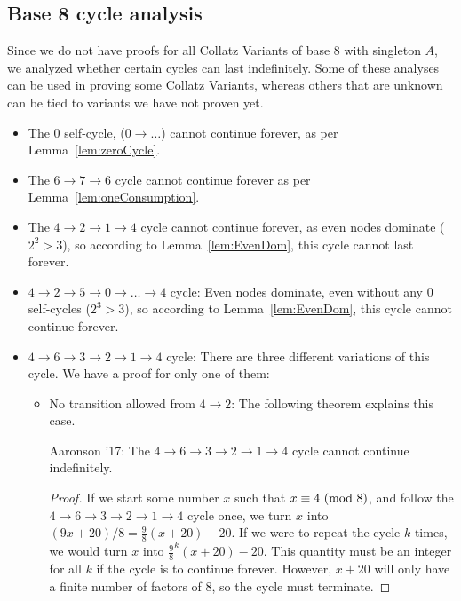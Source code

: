 \subsection{Base 8 cycle analysis} \label{subsubsec:cycleanalysis}
Since we do not have proofs for all Collatz Variants of base 8 with singleton $A$, we analyzed whether certain cycles can last indefinitely. Some of these analyses can be used in proving some Collatz Variants, whereas others that are unknown can be tied to variants we have not proven yet.
\begin{itemize}
    \item The 0 self-cycle, ($0  \rightarrow \ldots$) cannot continue forever, as per Lemma~\ref{lem:zeroCycle}.
    \item The $6 \rightarrow 7 \rightarrow 6$ cycle cannot continue forever as per Lemma~\ref{lem:oneConsumption}.
    \item The $4 \rightarrow 2 \rightarrow 1 \rightarrow 4$ cycle cannot continue forever, as even nodes dominate ($2^2 > 3$), so according to Lemma~\ref{lem:EvenDom}, this cycle cannot last forever.
    \item $4 \rightarrow 2 \rightarrow 5 \rightarrow 0  \rightarrow \ldots \rightarrow 4$ cycle:  Even nodes dominate, even without any 0 self-cycles ($2^3 > 3$), so according to Lemma~\ref{lem:EvenDom}, this cycle cannot continue forever.
    \item $4 \rightarrow 6 \rightarrow 3 \rightarrow 2 \rightarrow 1 \rightarrow 4$ cycle: There are three different variations of this cycle. We have a proof for only one of them:
\begin{itemize}
  \item No transition allowed from $4 \rightarrow 2$: The following theorem explains this case.
  \begin{theorem} Aaronson '17: The $4 \rightarrow 6 \rightarrow 3 \rightarrow 2 \rightarrow 1 \rightarrow 4$ cycle cannot continue indefinitely.
  \end{theorem}
  \begin{proof}
    If we start some number $x$ such that $x \equiv 4\ (\mathrm{mod}\ 8)$, and follow the $4 \rightarrow 6 \rightarrow 3 \rightarrow 2 \rightarrow 1 \rightarrow 4$ cycle once, we turn $x$ into $(9x+20)/8 = \frac{9}{8}(x+20)-20$. If we were to repeat the cycle $k$ times, we would turn $x$ into $\frac{9}{8}^k(x+20)-20$. This quantity must be an integer for all $k$ if the cycle is to continue forever. However, $x+20$ will only have a finite number of factors of 8, so the cycle must terminate.
  \end{proof}

\end{itemize}
\end{itemize}
